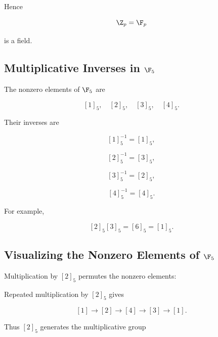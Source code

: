 Hence

\[ \Z_p=\F_p \]

is a field.

\subsection{Multiplicative Inverses in \(\F_5\)}
\label{subsec:inverses-f5}

The nonzero elements of \(\F_5\) are

\[ [1]_5,\quad[2]_5,\quad[3]_5,\quad[4]_5. \]

Their inverses are

\[ [1]_5^{-1}=[1]_5, \]

\[ [2]_5^{-1}=[3]_5, \]

\[ [3]_5^{-1}=[2]_5, \]

\[ [4]_5^{-1}=[4]_5. \]

For example,

\[ [2]_5[3]_5=[6]_5=[1]_5. \]

\subsection{Visualizing the Nonzero Elements of \(\F_5\)}
\label{subsec:visual-f5-multiplicative}

Multiplication by \([2]_5\) permutes the nonzero elements:

\begin{center}
\end{center}

Repeated multiplication by \([2]_5\) gives

\[ [1]\to[2]\to[4]\to[3]\to[1]. \]

Thus \([2]_5\) generates the multiplicative group

